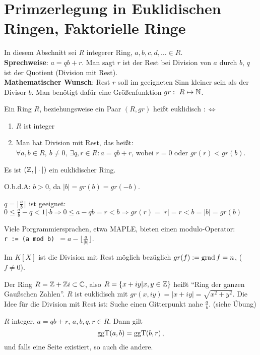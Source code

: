 \documentclass[a4paper,DIV15,BCOR12mm]{article}
\begin{document}
\section{Primzerlegung in Euklidischen Ringen, Faktorielle Ringe}
In diesem Abschnitt sei $R$ integerer Ring, $a,b,c,d,\dotsc \in
R$.\\
\textbf{Sprechweise}: $a=qb+r$. Man sagt $r$ ist der Rest bei
Division von $a$ durch $b$, $q$ ist der Quotient (Division mit
Rest).\\
\textbf{Mathematischer Wunsch}: Rest $r$ soll im geeigneten Sinn
kleiner sein als der Divisor $b$. Man benötigt dafür eine
Größenfunktion $gr:\ R\mapsto \MdN$.
\begin{definition}
    Ein Ring $R$, beziehungsweise ein Paar $(R,gr)$ heißt euklidisch
    $:\iff$
    \begin{enumerate}
        \item $R$ ist integer\\
        \item Man hat Division mit Rest, das heißt:\\ $\forall a,b \in
        R,\ b\neq 0,\ \exists q,r\in R: a=qb+r$, wobei $r=0$ oder
        $gr(r)<gr(b)$.
    \end{enumerate}
\end{definition}

Es ist $(\mathbb{Z}, |\cdot|)$ ein euklidischer Ring.
\begin{beweis}
O.b.d.A: $b>0$, da $|b| = gr(b) = gr(-b)$.

$q=\lfloor \frac a b \rfloor$ ist geeignet: $0\le \frac a b - q < 1
|\cdot b \Rightarrow 0 \le a - qb  = r < b \Rightarrow gr(r) = |r| =
r<b = |b| =gr(b)$
\end{beweis}

Viele Porgrammiersprachen, etwa MAPLE, bieten einen modulo-Operator:\\
\texttt{r := (a mod b) }$= a - \lfloor \frac a {|b|} \rfloor$.

Im $K[X]$ ist die Division mit Rest möglich bezüglich $gr(f) :=
\mathop{\rm grad}\nolimits f = n$, ($f\ne 0$).

Der Ring $R = \mathbb{Z} + \mathbb{Z} i \subset \mathbb{C}$, also $R =
\{x+iy|x,y\in\mathbb{Z}\}$ heißt "`Ring der ganzen Gaußschen Zahlen"'. $R$
ist euklidisch mit $gr(x,iy) = |x+iy| = \sqrt{x^2+y^2}$. Die Idee
für die Division mit Rest ist: Suche einen Gitterpunkt nahe $\frac a
b$. (siehe Übung)

\begin{lemma}
$R$ integer, $a= qb+r$, $a,b,q,r\in R$. Dann gilt
\[ \mathop{\rm ggT}\nolimits(a,b) = \mathop{\rm ggT}\nolimits(b,r)\,, \]
und falls eine Seite existiert, so auch die andere.
\end{lemma}
\end{document}
